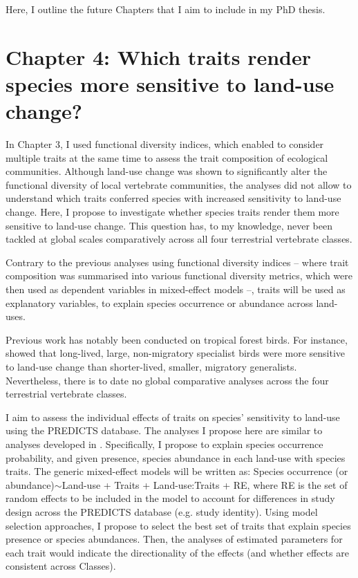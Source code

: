 Here, I outline the future Chapters that I aim to include in my PhD thesis.

\section{Chapter 4: Which traits render species more sensitive to land-use change? }
In Chapter 3, I used functional diversity indices, which enabled to consider multiple traits at the same time to assess the trait composition of ecological communities. Although land-use change was shown to significantly alter the functional diversity of local vertebrate communities, the analyses did not allow to understand which traits conferred species with increased sensitivity to land-use change. Here, I propose to investigate whether species traits render them more sensitive to land-use change. This question has, to my knowledge, never been tackled at global scales comparatively across all four terrestrial vertebrate classes.

Contrary to the previous analyses using functional diversity indices -- where trait composition was summarised into various functional diversity metrics, which were then used as dependent variables in mixed-effect models --, traits will be used as explanatory variables, to explain species occurrence or abundance across land-uses.

Previous work has notably been conducted on tropical forest birds. For instance, \citet{Newbold2013} showed that long-lived, large, non-migratory specialist birds were more sensitive to land-use change than shorter-lived, smaller, migratory generalists. Nevertheless, there is to date no global comparative analyses across the four terrestrial vertebrate classes.

I aim to assess the individual effects of traits on species’ sensitivity to land-use using the PREDICTS database. The analyses I propose here are similar to analyses developed in \citet{Newbold2013}. Specifically, I propose to explain species occurrence probability, and given presence, species abundance in each land-use with species traits. The generic mixed-effect models will be written as:  Species occurrence (or abundance)$\sim$Land-use + Traits + Land-use:Traits + RE, where RE is the set of random effects to be included in the model to account for differences in study design across the PREDICTS database (e.g. study identity). Using model selection approaches, I propose to select the best set of traits that explain species presence or species abundances. Then, the analyses of estimated parameters for each trait would indicate the directionality of the effects (and whether effects are consistent across Classes).

